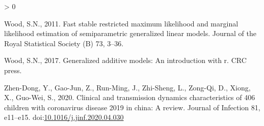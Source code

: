 \documentclass[]{elsarticle} %
\newlength{\cslhangindent}
\newenvironment{CSLReferences}[2] %
 {%
  \setlength{\parindent}{0pt}
  \ifodd #1 \everypar{\setlength{\hangindent}{\cslhangindent}}\ignorespaces\fi
  \ifnum #2 > 0
  \setlength{\parskip}{#2\baselineskip}
  \fi
 }%
 {}
\begin{document}
\begin{CSLReferences}{1}{0}
\leavevmode\hypertarget{ref-wood2011fast}{}%
Wood, S.N., 2011. Fast stable restricted maximum likelihood and marginal
likelihood estimation of semiparametric generalized linear models.
Journal of the Royal Statistical Society (B) 73, 3--36.

\leavevmode\hypertarget{ref-wood2017generalized}{}%
Wood, S.N., 2017. Generalized additive models: An introduction with r.
CRC press.

\leavevmode\hypertarget{ref-zhendong2020clinical}{}%
Zhen-Dong, Y., Gao-Jun, Z., Run-Ming, J., Zhi-Sheng, L., Zong-Qi, D.,
Xiong, X., Guo-Wei, S., 2020. Clinical and transmission dynamics
characteristics of 406 children with coronavirus disease 2019 in china:
A review. Journal of Infection 81, e11--e15.
doi:\href{https://doi.org/10.1016/j.jinf.2020.04.030}{10.1016/j.jinf.2020.04.030}

\end{CSLReferences}
\end{document}
